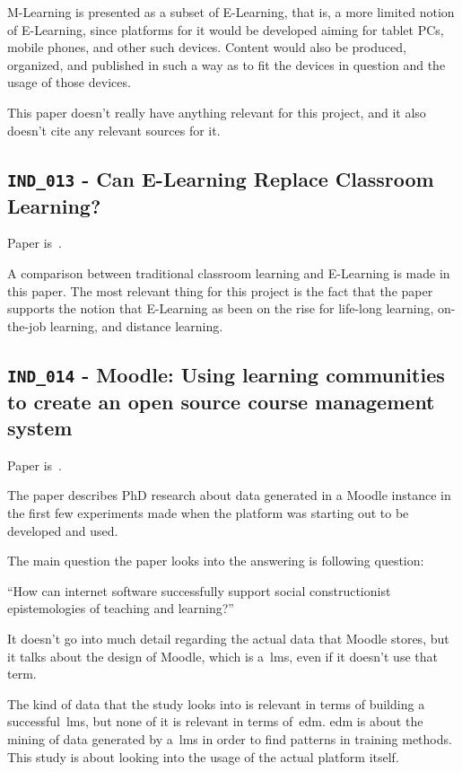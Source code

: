 M-Learning is presented as a subset of E-Learning, that is, a more limited
notion of E-Learning, since platforms for it would be developed aiming for
tablet PCs, mobile phones, and other such devices. Content would also be
produced, organized, and published in such a way as to fit the devices in
question and the usage of those devices.

This paper doesn't really have anything relevant for this project, and it also
doesn't cite any relevant sources for it.

\subsection{\texttt{IND\_013} - Can E-Learning Replace Classroom Learning?}

Paper is~\cite{ind_013}.

A comparison between traditional classroom learning and E-Learning is made in
this paper. The most relevant thing for this project is the fact that the paper
supports the notion that E-Learning as been on the rise for life-long learning,
on-the-job learning, and distance learning.

\subsection{\texttt{IND\_014} - Moodle: Using learning communities to create an
open source course management system}

Paper is~\cite{ind_014}.

The paper describes PhD research about data generated in a Moodle instance in
the first few experiments made when the platform was starting out to be
developed and used.

The main question the paper looks into the answering is following question:

``How can internet software successfully support social constructionist
epistemologies of teaching and learning?''

It doesn't go into much detail regarding the actual data that Moodle stores,
but it talks about the design of Moodle, which is a~\gls{lms}, even if it
doesn't use that term.

The kind of data that the study looks into is relevant in terms of building a
successful~\gls{lms}, but none of it is relevant in terms of~\gls{edm}.
\gls{edm} is about the mining of data generated by a~\gls{lms} in order to find
patterns in training methods. This study is about looking into the usage of the
actual platform itself.
